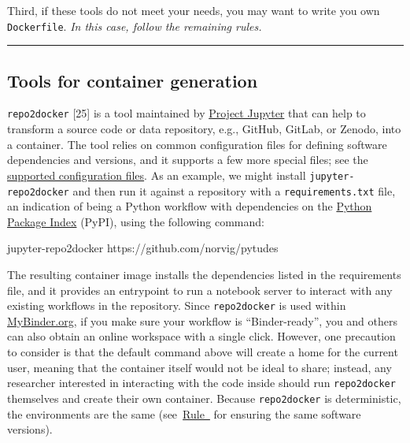 \documentclass[10pt,letterpaper]{article}
\newenvironment{Shaded}{\begin{snugshade}}{\end{snugshade}}
\newcommand{\ExtensionTok}[1]{#1}
\newcommand{\NormalTok}[1]{#1}
\begin{document}
Third, if these tools do not meet your needs, you may want to write you
own \texttt{Dockerfile}. \emph{In this case, follow the remaining
rules.}

\begin{center}\rule{0.5\linewidth}{0.5pt}\end{center}

\hypertarget{tools-for-container-generation}{%
\subsection{Tools for container
generation}\label{tools-for-container-generation}}

\texttt{repo2docker} {[}25{]} is a tool maintained by
\href{https://jupyter.org/}{Project Jupyter} that can help to transform
a source code or data repository, e.g., GitHub, GitLab, or Zenodo, into
a container. The tool relies on common configuration files for defining
software dependencies and versions, and it supports a few more special
files; see the
\href{https://repo2docker.readthedocs.io/en/latest/config_files.html}{supported
configuration files}. As an example, we might install
\texttt{jupyter-repo2docker} and then run it against a repository with a
\texttt{requirements.txt} file, an indication of being a Python workflow
with dependencies on the \href{https://pypi.org/}{Python Package Index}
(PyPI), using the following command:

\footnotesize

\begin{Shaded}
\begin{Highlighting}[]
\ExtensionTok{jupyter-repo2docker}\NormalTok{ https://github.com/norvig/pytudes}
\end{Highlighting}
\end{Shaded}

\normalsize

The resulting container image installs the dependencies listed in the
requirements file, and it provides an entrypoint to run a notebook
server to interact with any existing workflows in the repository. Since
\texttt{repo2docker} is used within
\href{https://mybinder.org/}{MyBinder.org}, if you make sure your
workflow is ``Binder-ready'', you and others can also obtain an online
workspace with a single click. However, one precaution to consider is
that the default command above will create a home for the current user,
meaning that the container itself would not be ideal to share; instead,
any researcher interested in interacting with the code inside should run
\texttt{repo2docker} themselves and create their own container. Because
\texttt{repo2docker} is deterministic, the environments are the same
(see~\hyperref[{rule:pinning}]{Rule~} for
ensuring the same software versions).
\end{document}
